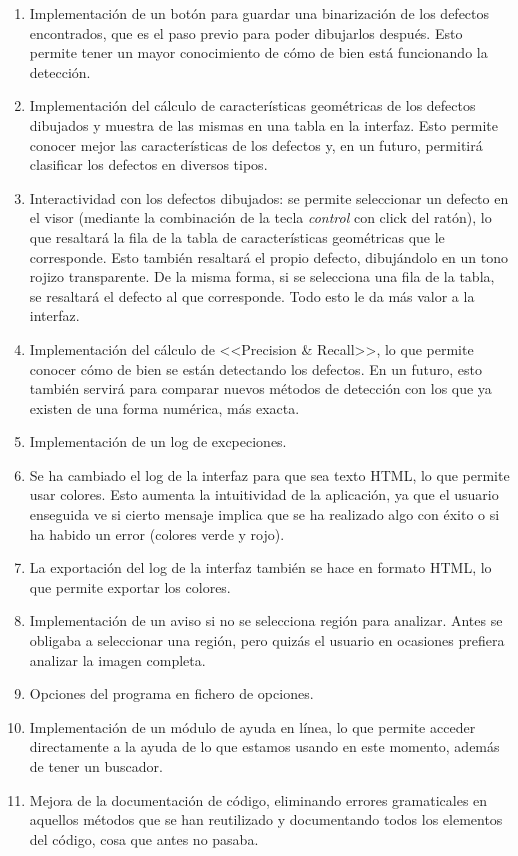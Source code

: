 \begin{enumerate}
\item Implementación de un botón para guardar una binarización de los defectos encontrados, que es el paso previo para poder dibujarlos después. Esto permite tener un mayor conocimiento de cómo de bien está funcionando la detección.
\item Implementación del cálculo de características geométricas de los defectos dibujados y muestra de las mismas en una tabla en la interfaz. Esto permite conocer mejor las características de los defectos y, en un futuro, permitirá clasificar los defectos en diversos tipos.
\item Interactividad con los defectos dibujados: se permite seleccionar un defecto en el visor (mediante la combinación de la tecla \textit{control} con click del ratón), lo que resaltará la fila de la tabla de características geométricas que le corresponde. Esto también resaltará el propio defecto, dibujándolo en un tono rojizo transparente. De la misma forma, si se selecciona una fila de la tabla, se resaltará el defecto al que corresponde. Todo esto le da más valor a la interfaz.
\item Implementación del cálculo de <<Precision \& Recall>>, lo que permite conocer cómo de bien se están detectando los defectos. En un futuro, esto también servirá para comparar nuevos métodos de detección con los que ya existen de una forma numérica, más exacta.
\item Implementación de un log de excpeciones.
\item Se ha cambiado el log de la interfaz para que sea texto HTML, lo que permite usar colores. Esto aumenta la intuitividad de la aplicación, ya que el usuario enseguida ve si cierto mensaje implica que se ha realizado algo con éxito o si ha habido un error (colores verde y rojo).
\item La exportación del log de la interfaz también se hace en formato HTML, lo que permite exportar los colores.
\item Implementación de un aviso si no se selecciona región para analizar. Antes se obligaba a seleccionar una región, pero quizás el usuario en ocasiones prefiera analizar la imagen completa.
\item Opciones del programa en fichero de opciones.
\item Implementación de un módulo de ayuda en línea, lo que permite acceder directamente a la ayuda de lo que estamos usando en este momento, además de tener un buscador.
\item Mejora de la documentación de código, eliminando errores gramaticales en aquellos métodos que se han reutilizado y documentando todos los elementos del código, cosa que antes no pasaba.
\end{enumerate}


